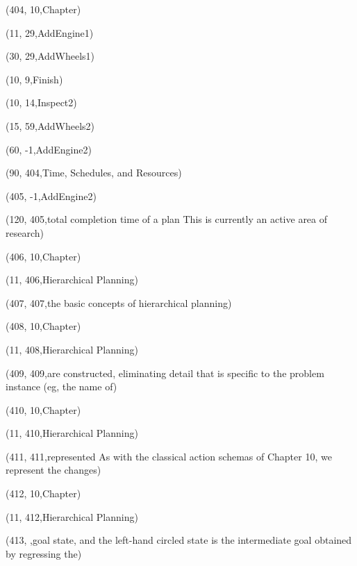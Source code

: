 (404, 10,Chapter)

(11, 29,AddEngine1)

(30, 29,AddWheels1)

(10, 9,Finish)

(10, 14,Inspect2)

(15, 59,AddWheels2)

(60, -1,AddEngine2)

(90, 404,Time, Schedules, and Resources)

(405, -1,AddEngine2)

(120, 405,total completion time of a plan This is currently an active area of research)

(406, 10,Chapter)

(11, 406,Hierarchical Planning)

(407, 407,the basic concepts of hierarchical planning)

(408, 10,Chapter)

(11, 408,Hierarchical Planning)

(409, 409,are constructed, eliminating detail that is speciﬁc to the problem instance (eg, the name of)

(410, 10,Chapter)

(11, 410,Hierarchical Planning)

(411, 411,represented As with the classical action schemas of Chapter 10, we represent the changes)

(412, 10,Chapter)

(11, 412,Hierarchical Planning)

(413, ,goal state, and the left-hand circled state is the intermediate goal obtained by regressing the)

